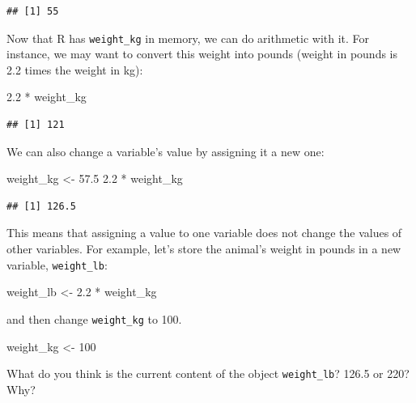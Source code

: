 \documentclass[]{book}
\newenvironment{Shaded}{\begin{snugshade}}{\end{snugshade}}
\newcommand{\DecValTok}[1]{\textcolor[rgb]{0.00,0.00,0.81}{{#1}}}
\newcommand{\FloatTok}[1]{\textcolor[rgb]{0.00,0.00,0.81}{{#1}}}
\newcommand{\StringTok}[1]{\textcolor[rgb]{0.31,0.60,0.02}{{#1}}}
\newcommand{\NormalTok}[1]{{#1}}
\theoremstyle{definition}
\theoremstyle{definition}
\theoremstyle{definition}
\theoremstyle{remark}
\begin{document}
\begin{verbatim}
## [1] 55
\end{verbatim}

Now that R has \texttt{weight\_kg} in memory, we can do arithmetic with
it. For instance, we may want to convert this weight into pounds (weight
in pounds is 2.2 times the weight in kg):

\begin{Shaded}
\begin{Highlighting}[]
\FloatTok{2.2} \NormalTok{*}\StringTok{ }\NormalTok{weight_kg}
\end{Highlighting}
\end{Shaded}

\begin{verbatim}
## [1] 121
\end{verbatim}

We can also change a variable's value by assigning it a new one:

\begin{Shaded}
\begin{Highlighting}[]
\NormalTok{weight_kg <-}\StringTok{ }\FloatTok{57.5}
\FloatTok{2.2} \NormalTok{*}\StringTok{ }\NormalTok{weight_kg}
\end{Highlighting}
\end{Shaded}

\begin{verbatim}
## [1] 126.5
\end{verbatim}

This means that assigning a value to one variable does not change the
values of other variables. For example, let's store the animal's weight
in pounds in a new variable, \texttt{weight\_lb}:

\begin{Shaded}
\begin{Highlighting}[]
\NormalTok{weight_lb <-}\StringTok{ }\FloatTok{2.2} \NormalTok{*}\StringTok{ }\NormalTok{weight_kg}
\end{Highlighting}
\end{Shaded}

and then change \texttt{weight\_kg} to 100.

\begin{Shaded}
\begin{Highlighting}[]
\NormalTok{weight_kg <-}\StringTok{ }\DecValTok{100}
\end{Highlighting}
\end{Shaded}

What do you think is the current content of the object
\texttt{weight\_lb}? 126.5 or 220? Why?
\end{document}
